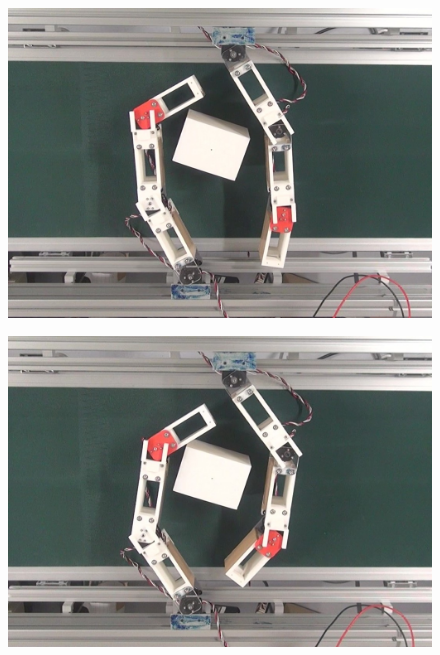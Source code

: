 \documentclass[a4paper,twoside,12pt,papersize, dvipdfmx]{iirthesis}
\begin{document}
\begin{figure}[b]
\centering
\begin{minipage}{0.249\hsize}
\centering
\includegraphics[width=0.98\hsize]{fig/4-manipulation-result/Rectangle/1-1.jpg}
\subcaption{}\label{}
\end{minipage}\hfill
\begin{minipage}{0.249\hsize}
\centering
\includegraphics[width=0.98\hsize]{fig/4-manipulation-result/Rectangle/1-2.jpg}
\subcaption{}\label{}
\end{minipage}\hfill
\begin{minipage}{0.249\hsize}
\centering

\end{minipage}
\end{figure}
\end{document}
